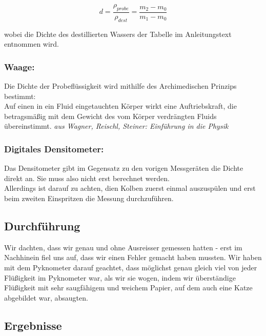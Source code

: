 \documentclass{article}
\begin{document}
\begin{equation}
d=\frac{\rho_{probe}}{\rho_{dest}}=\frac{m_2 - m_0}{m_1 - m_0}
\end{equation}

wobei die Dichte des destillierten Wassers der Tabelle im Anleitungstext entnommen wird. 

\subsubsection*{Waage:}
Die Dichte der Probeflüssigkeit wird mithilfe des Archimedischen Prinzips bestimmt: \\
Auf einen in ein Fluid eingetauchten Körper wirkt eine Auftriebskraft, die betragsmäßig mit dem Gewicht des vom Körper verdrängten Fluids übereinstimmt. \textit{aus Wagner, Reischl, Steiner: Einführung in die Physik}

\subsubsection*{Digitales Densitometer:}
Das Densitometer gibt im Gegensatz zu den vorigen Messgeräten die Dichte direkt an. Sie muss also nicht erst berechnet werden.\\
Allerdings ist darauf zu achten, dien Kolben zuerst einmal auszuspülen und erst beim zweiten Einspritzen die Messung durchzuführen.

\subsection{Durchführung}
Wir dachten, dass wir genau und ohne Ausreisser gemessen hatten - erst im Nachhinein fiel uns auf, dass wir einen Fehler gemacht haben mussten. Wir haben mit dem Pyknometer darauf geachtet, dass möglichst genau gleich viel von jeder Flüßigkeit im Pyknometer war, als wir sie wogen, indem wir überständige Flüßigkeit mit sehr saugfähigem und weichem Papier, auf dem auch eine Katze abgebildet war, absaugten. 
\subsection{Ergebnisse}
\end{document}
